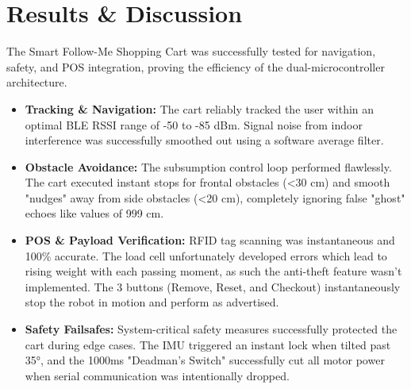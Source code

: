 \documentclass[12pt,a4paper]{article}
\begin{document}
\section{Results \& Discussion}
The Smart Follow-Me Shopping Cart was successfully tested for navigation, safety, and POS integration, proving the efficiency of the dual-microcontroller architecture.
\begin{itemize}
    \item \textbf{Tracking \& Navigation:} The cart reliably tracked the user within an optimal BLE RSSI range of -50 to -85 dBm. Signal noise from indoor interference was successfully smoothed out using a software average filter.

    \item \textbf{Obstacle Avoidance:} The subsumption control loop performed flawlessly. The cart executed instant stops for frontal obstacles (<30 cm) and smooth "nudges" away from side obstacles (<20 cm), completely ignoring false "ghost" echoes like values of 999 cm.

    \item \textbf{POS \& Payload Verification:} RFID tag scanning was instantaneous and 100\% accurate. The load cell unfortunately developed errors which lead to rising weight with each passing moment, as such the anti-theft feature wasn’t implemented. The 3 buttons (Remove, Reset, and Checkout) instantaneously stop the robot in motion and perform as advertised.

    \item \textbf{Safety Failsafes:} System-critical safety measures successfully protected the cart during edge cases. The IMU triggered an instant lock when tilted past 35°, and the 1000ms "Deadman's Switch" successfully cut all motor power when serial communication was intentionally dropped. 
\end{itemize}
\end{document}
